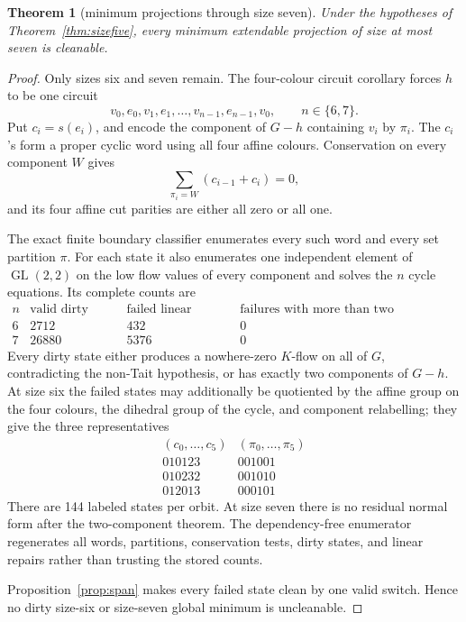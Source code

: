 \documentclass[11pt]{article}
\newtheorem{theorem}{Theorem}[section]
\theoremstyle{definition}
\theoremstyle{remark}
\begin{document}
\begin{theorem}[minimum projections through size seven]
\label{thm:sizeseven}
Under the hypotheses of Theorem~\ref{thm:sizefive}, every minimum
extendable projection of size at most seven is cleanable.
\end{theorem}

\begin{proof}
Only sizes six and seven remain.  The four-colour circuit corollary forces
\(h\) to be one circuit
\[
 v_0,e_0,v_1,e_1,\ldots,v_{n-1},e_{n-1},v_0,
 \qquad n\in\{6,7\}.
\]
Put \(c_i=s(e_i)\), and encode the component of \(G-h\) containing \(v_i\)
by \(\pi_i\).  The \(c_i\)'s form a proper cyclic word using all four
affine colours.  Conservation on every component \(W\) gives
\[
 \sum_{\pi_i=W}(c_{i-1}+c_i)=0,
\]
and its four affine cut parities are either all zero or all one.

The exact finite boundary classifier enumerates every such word and every
set partition \(\pi\).  For each
state it also enumerates one independent element of
\(\operatorname{GL}(2,2)\) on the low flow values of every component and
solves the \(n\) cycle equations.  Its complete counts are
\[
\begin{array}{c|r|r|r}
n&\text{valid dirty pairs}&\text{failed linear repairs}&
\text{failures with more than two components}\\
\hline
6&2712&432&0\\
7&26880&5376&0
\end{array}
\]
Every dirty state either produces a
nowhere-zero \(K\)-flow on all of \(G\), contradicting the non-Tait
hypothesis, or has exactly two components of \(G-h\).  At size six the
failed states may additionally be quotiented by the affine group on the
four colours, the dihedral group of the cycle, and component relabelling;
they give the three representatives
\[
\begin{array}{c|c}
(c_0,\ldots,c_5)&(\pi_0,\ldots,\pi_5)\\
\hline
010123&001001\\
010232&001010\\
012013&000101
\end{array}
\]
There are 144 labeled states per orbit.  At size seven there is no residual
normal form after the two-component theorem.  The dependency-free
enumerator regenerates all words, partitions, conservation tests, dirty
states, and linear repairs rather than trusting the stored counts.

Proposition~\ref{prop:span} makes every failed state clean by one valid
switch.  Hence no dirty size-six or size-seven global minimum is
uncleanable.
\end{proof}
\end{document}
